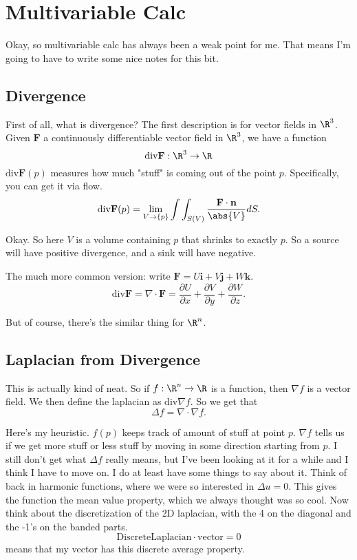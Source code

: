 \documentclass{article}
\newcommand{\F}[0]{\textbf{F}}
\newcommand{\grad}[0]{\nabla}
\newcommand{\dive}[0]{\text{div}}
\begin{document}
\section{Multivariable Calc}

Okay, so multivariable calc has always been a weak point for me. That means I'm going to have to write some nice notes for this bit.

\subsection{Divergence}

First of all, what is divergence? The first description is for vector fields in
$\R^3$.  Given $\F$ a continuously differentiable vector field in $\R^3$, we
have a function
\[\dive\F : \R^3 \to \R\]
$\dive\F(p)$ measures how much "stuff" is coming out of
the point $p$. Specifically, you can get it via flow.
\[\dive\F(p) = \lim_{V \to \{p\}} \int\int_{S(V)} \frac{\F\cdot \textbf{n}}{\abs{V}}dS.\]

Okay. So here $V$ is a volume containing $p$ that shrinks to
exactly $p$. So a source will have positive divergence, and a sink will have
negative.

The much more common version: write $\F = U\textbf{i} + V\textbf{j} + W\textbf{k}$.
\[\dive\F = \grad\cdot\F = \frac{\partial U}{\partial x} + \frac{\partial V}{\partial y} + \frac{\partial W}{\partial z}.\]

But of course, there's the similar thing for $\R^n$.

\subsection{Laplacian from Divergence}

This is actually kind of neat. So if $f: \R^n \to \R$ is a function, then
$\grad f$ is a vector field.  We then define the laplacian as $\dive \grad f$. So
we get that
\[\Delta f = \grad \cdot \grad f.\]

Here's my heuristic. $f(p)$ keeps track of amount of stuff at point $p$.
$\grad f$ tells us if we get more stuff or less stuff by moving in some
direction starting from $p$. I still don't get what $\Delta f$ really means, but
I've been looking at it for a while and I think I have to move on. I do at least
have some things to say about it.  Think of back in harmonic functions, where we
were so interested in $\Delta u = 0$. This gives the function the mean value
property, which we always thought was so cool. Now think about the
discretization of the 2D laplacian, with the 4 on the diagonal and the -1's on
the banded parts.
\[\text{DiscreteLaplacian}\cdot\text{vector} = 0\]
means that my vector has this discrete average property.
\end{document}
